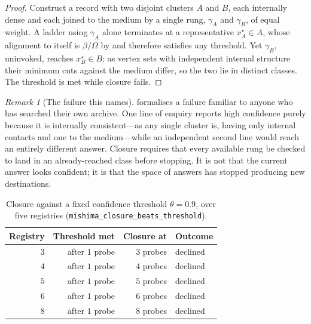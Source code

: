 \documentclass[11pt,twocolumn,a4paper]{article}
\theoremstyle{definition}
\theoremstyle{remark}
\newtheorem{remark}[theorem]{Remark}
\newcommand{\flo}{\beta}
\newcommand{\Om}{\Omega}
\begin{document}
\begin{proof}
Construct a record with two disjoint clusters $A$ and $B$, each internally dense
and each joined to the medium by a single rung, $\gamma_A$ and $\gamma_B$, of
equal weight. A ladder using $\gamma_A$ alone terminates at a representative
$x^{\star}_A\in A$, whose alignment to itself is $\flo/\Om$ by
 and therefore satisfies any threshold. Yet $\gamma_B$,
uninvoked, reaches $x^{\star}_B\in B$; as vertex sets with independent internal
structure their minimum cuts against the medium differ, so the two lie in
distinct classes. The threshold is met while closure fails.
\end{proof}

\begin{remark}[The failure this names]
\label{rem:why-threshold}
 formalises a failure familiar to anyone who has
searched their own archive. One line of enquiry reports high confidence purely
because it is internally consistent---as any single cluster is, having only
internal contacts and one to the medium---while an independent second line would
reach an entirely different answer. Closure requires that every available rung be
checked to land in an already-reached class before stopping. It is not that the
current answer looks confident; it is that the space of answers has stopped
producing new destinations.
\end{remark}

\begin{table}[H]
\centering
\small
\caption{Closure against a fixed confidence threshold $\theta=0.9$, over five
registries (\texttt{mishima\_closure\_beats\_threshold}).}
\label{tab:closure}
\begin{tabular}{@{}rrrl@{}}
\toprule
Registry & Threshold met & Closure at & Outcome \\
\midrule
$3$ & after $1$ probe & $3$ probes & declined \\
$4$ & after $1$ probe & $4$ probes & declined \\
$5$ & after $1$ probe & $5$ probes & declined \\
$6$ & after $1$ probe & $6$ probes & declined \\
$8$ & after $1$ probe & $8$ probes & declined \\
\bottomrule
\end{tabular}
\end{table}
\end{document}
